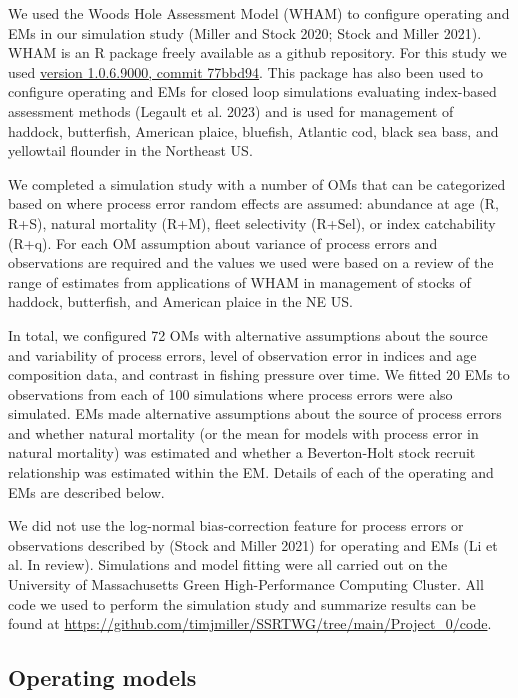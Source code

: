 \documentclass[
  12pt,
]{article}
\begin{document}
We used the Woods Hole Assessment Model (WHAM) to configure operating
and EMs in our simulation study (Miller and Stock 2020; Stock and Miller
2021). WHAM is an R package freely available as a github repository. For
this study we used
\href{https://github.com/timjmiller/wham/tree/77bbd946e4881216a439933473d1c58b21c270c3}{version
1.0.6.9000, commit 77bbd94}. This package has also been used to
configure operating and EMs for closed loop simulations evaluating
index-based assessment methods (Legault et al. 2023) and is used for
management of haddock, butterfish, American plaice, bluefish, Atlantic
cod, black sea bass, and yellowtail flounder in the Northeast US.

We completed a simulation study with a number of OMs that can be
categorized based on where process error random effects are assumed:
abundance at age (R, R+S), natural mortality (R+M), fleet selectivity
(R+Sel), or index catchability (R+q). For each OM assumption about
variance of process errors and observations are required and the values
we used were based on a review of the range of estimates from
applications of WHAM in management of stocks of haddock, butterfish, and
American plaice in the NE US.

In total, we configured 72 OMs with alternative assumptions about the
source and variability of process errors, level of observation error in
indices and age composition data, and contrast in fishing pressure over
time. We fitted 20 EMs to observations from each of 100 simulations
where process errors were also simulated. EMs made alternative
assumptions about the source of process errors and whether natural
mortality (or the mean for models with process error in natural
mortality) was estimated and whether a Beverton-Holt stock recruit
relationship was estimated within the EM. Details of each of the
operating and EMs are described below.

We did not use the log-normal bias-correction feature for process errors
or observations described by (Stock and Miller 2021) for operating and
EMs (Li et al. In review). Simulations and model fitting were all
carried out on the University of Massachusetts Green High-Performance
Computing Cluster. All code we used to perform the simulation study and
summarize results can be found at
\url{https://github.com/timjmiller/SSRTWG/tree/main/Project_0/code}.

\hypertarget{operating-models}{%
\subsection*{Operating models}\label{operating-models}}
\end{document}
